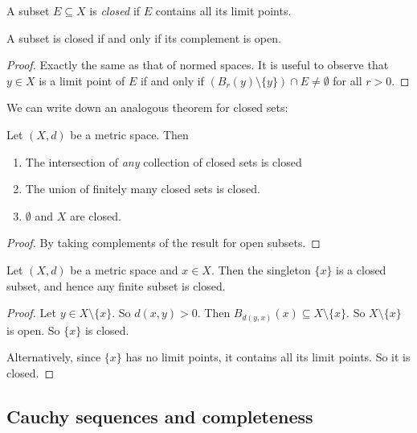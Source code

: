 \documentclass[a4paper]{article}
\begin{document}
\begin{defi}
  A subset $E\subseteq X$ is \emph{closed} if $E$ contains all its limit points.
\end{defi}

\begin{prop}
  A subset is closed if and only if its complement is open.
\end{prop}

\begin{proof}
  Exactly the same as that of normed spaces. It is useful to observe that $y \in X$ is a limit point of $E$ if and only if $(B_r(y)\setminus \{y\}) \cap E \not= \emptyset$ for all $r > 0$.
\end{proof}

We can write down an analogous theorem for closed sets:
\begin{thm}[]
  Let $(X, d)$ be a metric space. Then
  \begin{enumerate}
    \item The intersection of \emph{any} collection of closed sets is closed
    \item The union of finitely many closed sets is closed.
    \item $\emptyset$ and $X$ are closed.
  \end{enumerate}
\end{thm}

\begin{proof}
  By taking complements of the result for open subsets.
\end{proof}

\begin{prop}
  Let $(X, d)$ be a metric space and $x \in X$. Then the singleton $\{x\}$ is a closed subset, and hence any finite subset is closed.
\end{prop}

\begin{proof}
  Let $y \in X \setminus \{x\}$. So $d(x, y) > 0$. Then $B_{d(y, x)}(x) \subseteq X\setminus \{x\}$. So $X\setminus \{x\}$ is open. So $\{x\}$ is closed.

  Alternatively, since $\{x\}$ has no limit points, it contains all its limit points. So it is closed.
\end{proof}

\subsection{Cauchy sequences and completeness}
\end{document}
